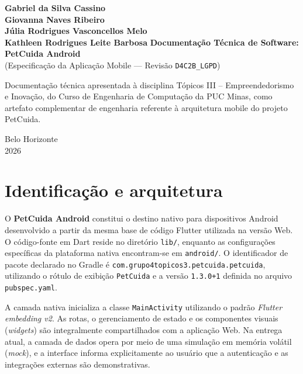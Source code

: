 \documentclass[12pt,a4paper]{article}
\begin{document}
\begin{titlepage}
\begin{center}
{\large\textbf{Gabriel da Silva Cassino}}\\
{\large\textbf{Giovanna Naves Ribeiro}}\\
{\large\textbf{Júlia Rodrigues Vasconcellos Melo}}\\
{\large\textbf{Kathleen Rodrigues Leite Barbosa}}
\vfill
{\Large\textbf{Documentação Técnica de Software: PetCuida Android}}\\
{\large (Especificação da Aplicação Mobile --- Revisão \texttt{D4C2B\_LGPD})}
\vfill
\end{center}
\begin{flushright}
\begin{minipage}{8cm}
\small Documentação técnica apresentada à disciplina Tópicos III -- Empreendedorismo e Inovação, do Curso de Engenharia de Computação da PUC Minas, como artefato complementar de engenharia referente à arquitetura mobile do projeto PetCuida.
\end{minipage}
\end{flushright}
\vfill
\begin{center}Belo Horizonte\\2026\end{center}
\end{titlepage}

\tableofcontents
\newpage


\section{Identificação e arquitetura}
O \textbf{PetCuida Android} constitui o destino nativo para dispositivos Android desenvolvido a partir da mesma base de código Flutter utilizada na versão Web. O código-fonte em Dart reside no diretório \texttt{lib/}, enquanto as configurações específicas da plataforma nativa encontram-se em \texttt{android/}. O identificador de pacote declarado no Gradle é \texttt{com.grupo4topicos3.petcuida.petcuida}, utilizando o rótulo de exibição \texttt{PetCuida} e a versão \texttt{1.3.0+1} definida no arquivo \texttt{pubspec.yaml}.

A camada nativa inicializa a classe \texttt{MainActivity} utilizando o padrão \textit{Flutter embedding v2}. As rotas, o gerenciamento de estado e os componentes visuais (\textit{widgets}) são integralmente compartilhados com a aplicação Web. Na entrega atual, a camada de dados opera por meio de uma simulação em memória volátil (\textit{mock}), e a interface informa explicitamente ao usuário que a autenticação e as integrações externas são demonstrativas.
\end{document}
